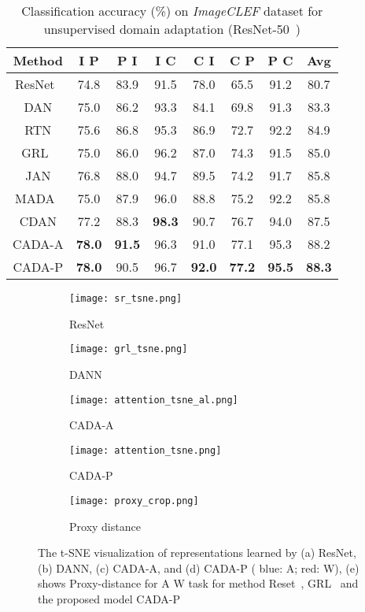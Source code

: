\documentclass[10pt,twocolumn,letterpaper]{article}
\begin{document}
\begin{table}[!]
\centering
\caption {Classification accuracy (\%) on \textit{ImageCLEF} dataset for unsupervised domain adaptation (ResNet-50~\cite{he2016deep})} 
\setlength\tabcolsep{1pt}\begin{tabular}{cccccccc}
 \toprule
  \textbf{Method }& I  P & P I &  I  C &C  I & C  P & P  C & Avg \\ 
  \midrule
ResNet~\cite{he2016deep} & 74.8 & 83.9 & 91.5 & 78.0 & 65.5 & 91.2 & 80.7 \\
DAN\cite{long_ICML2015} & 75.0 & 86.2 & 93.3 & 84.1 & 69.8 & 91.3 & 83.3 \\
RTN\cite{long_NIPS2016} & 75.6 & 86.8 & 95.3 & 86.9 & 72.7 & 92.2 & 84.9 \\
GRL~\cite{ganin_ICML2015} & 75.0 & 86.0 & 96.2 & 87.0 & 74.3 & 91.5 & 85.0 \\
JAN\cite{long_ICML2017} & 76.8 & 88.0 &94.7 & 89.5 & 74.2 & 91.7 & 85.8 \\ 
MADA~\cite{pei_arxiv2018} & 75.0 & 87.9 & 96.0 & 88.8 & 75.2 & 92.2 & 85.8 \\
CDAN\cite{long_arxive2017conditional} & 77.2 & 88.3 & \textbf{98.3} & 90.7 & 76.7 & 94.0 & 87.5  \\
 \midrule
 CADA-A & \textbf{78.0} & \textbf{91.5} & 96.3 & 91.0 & 77.1 & 95.3 & 88.2\\ 
CADA-P & \textbf{78.0} & {90.5} & 96.7 & \textbf{92.0} &  \textbf{77.2}  &  \textbf{95.5} & \textbf{88.3} \\
\bottomrule
\end{tabular}
\label{tbl:imageclef}
\end{table}
 
\begin{figure*}[!]
\begin{subfigure}{0.19\textwidth}
  \centering
  \texttt{[image: sr\_tsne.png]}
  \caption{ResNet}
  \label{fig:sfig1111}
\end{subfigure}
\begin{subfigure}{0.19\textwidth}
  \centering
  \texttt{[image: grl\_tsne.png]}
  \caption{DANN}
  \label{fig:sfig22}
\end{subfigure}
\begin{subfigure}{0.19\textwidth}
  \centering
  \texttt{[image: attention\_tsne\_al.png]}
  \caption{CADA-A}
  \label{fig:sfig3}
\end{subfigure}
\begin{subfigure}{0.19\textwidth}
  \centering
  \texttt{[image: attention\_tsne.png]}
  \caption{CADA-P}
  \label{fig:sfig44}
\end{subfigure}
\begin{subfigure}{0.14\textwidth}
  \centering
  \texttt{[image: proxy\_crop.png]}
  \caption{Proxy distance}
  \label{fig:sfig5}
\end{subfigure}
\caption{The t-SNE visualization of representations learned by (a) ResNet, (b) DANN, (c) CADA-A, and (d) CADA-P ({\color{blue} blue}: A; {\color{red} red}: W), 
(e) shows Proxy-distance for A  W task for method Reset~\cite{he2016deep}, GRL~\cite{ganin_ICML2015} and the proposed model CADA-P}
\label{fig:tsne}
\vspace{-0.5em}
\end{figure*}
\end{document}
